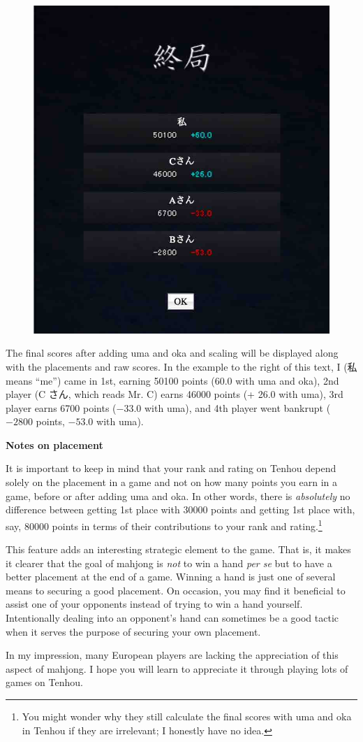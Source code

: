 \begin{figure}
\begin{center}
\includegraphics[width=.4\textwidth,clip]{figs/finalscore.jpg}
\end{center}
\vspace{-25pt}
\end{figure}

\bigskip

The final scores after adding {\jap uma} and {\jap oka} and scaling will be displayed along with the placements and raw scores. In the example to the right of this text, I (私 means ``me'') came in 1st, earning 50100 points (60.0 with {\jap uma} and {\jap oka}), 2nd player (C さん, which reads Mr. C) earns 46000 points (+ 26.0 with {\jap uma}), 3rd player earns 6700 points ($-33.0$ with {\jap uma}), and 4th player went bankrupt ($-2800$ points, $-53.0$ with {\jap uma}). 

\newpage

\begin{boxnote} \small
{\bf\normalsize Notes on placement}

\bigskip
It is important to keep in mind that your rank and rating on {\jap Tenhou} depend solely on the placement in a game and not on how many points you earn in a game, before or after adding {\jap uma} and {\jap oka}. In other words, there is \emph{absolutely} no difference between getting 1st place with 30000 points and getting 1st place with, say, 80000 points in terms of their contributions to your rank and rating.\footnote{You might wonder why they still calculate the final scores with {\jap uma} and {\jap oka} in {\jap Tenhou} if they are irrelevant; I honestly have no idea.}

\bigskip
This feature adds an interesting strategic element to the game. That is, it makes it clearer that the goal of mahjong is \emph{not} to win a hand \emph{per se} but to have a better placement at the end of a game. Winning a hand is just one of several means to securing a good placement. On occasion, you may find it beneficial to assist one of your opponents instead of trying to win a hand yourself. Intentionally dealing into an opponent's hand can sometimes be a good tactic when it serves the purpose of securing your own placement. 

\bigskip
In my impression, many European players are lacking the appreciation of this aspect of mahjong. I hope you will learn to appreciate it through playing lots of games on {\jap Tenhou}.
\vspace{5pt}
\end{boxnote}

